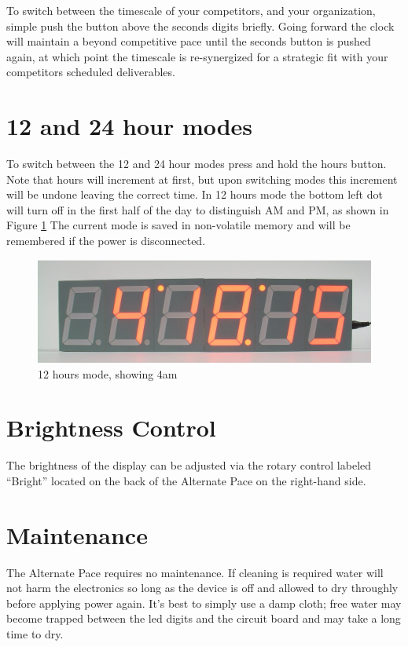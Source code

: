 \documentclass{article}
\begin{document}
To switch between the timescale of your competitors, and your organization,
simple push the button above the seconds digits briefly. Going forward the
clock will maintain a beyond competitive pace until the seconds button is
pushed again, at which point the timescale is re-synergized for a strategic fit
with your competitors scheduled deliverables.

\section{12 and 24 hour modes}

To switch between the 12 and 24 hour modes press and hold the hours button.
Note that hours will increment at first, but upon switching modes this
increment will be undone leaving the correct time. In 12 hours mode the bottom
left dot will turn off in the first half of the day to distinguish AM and PM,
as shown in Figure \ref{fig:front-running-12hr-am} The current mode is saved in
non-volatile memory and will be remembered if the power is disconnected.

\begin{figure}
\centering
\includegraphics[width=4.75in]{figures/front-running-12hr-am.eps}
\caption{12 hours mode, showing 4am}
\label{fig:front-running-12hr-am}
\end{figure}


\section{Brightness Control}

The brightness of the display can be adjusted via the rotary control labeled
``Bright'' located on the back of the Alternate Pace on the right-hand side.

\section{Maintenance}

The Alternate Pace requires no maintenance. If cleaning is required water
will not harm the electronics so long as the device is off and allowed to dry
throughly before applying power again. It's best to simply use a damp cloth;
free water may become trapped between the led digits and the circuit board and
may take a long time to dry.
\end{document}
